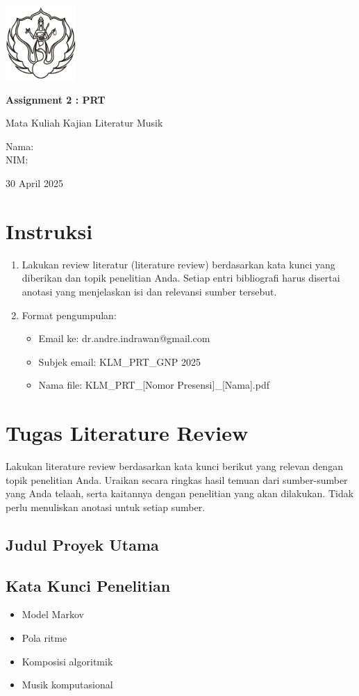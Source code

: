 \documentclass[a4paper,12pt]{article}
\newcommand{\AssignmentTitle}{Assignment 2 : PRT}
\renewcommand{\maketitle}{
  \begin{titlepage}
    \centering
    \includegraphics[width=0.2\textwidth]{../images/logo.png}\par\vspace{1cm}
    {\Huge\bfseries \AssignmentTitle}\par\vspace{0.5em}
    {\Large Mata Kuliah Kajian Literatur Musik}\par\vspace{2cm}
    {\large Nama: \AuthorName\\NIM: \AuthorNIM}\par\vspace{1cm}
    {\large 30 April 2025}\par
  \end{titlepage}
}
\begin{document}
\maketitle

\section*{Instruksi}
\begin{enumerate}
    \item Lakukan review literatur (literature review) berdasarkan kata kunci yang diberikan dan topik penelitian Anda. Setiap entri bibliografi harus disertai anotasi yang menjelaskan isi dan relevansi sumber tersebut.
    \item Format pengumpulan:
    \begin{itemize}
        \item Email ke: dr.andre.indrawan@gmail.com
        \item Subjek email: KLM\_PRT\_GNP 2025
        \item Nama file: KLM\_PRT\_[Nomor Presensi]\_[Nama].pdf
    \end{itemize}
\end{enumerate}

\section*{Tugas Literature Review}
Lakukan literature review berdasarkan kata kunci berikut yang relevan dengan topik penelitian Anda. Uraikan secara ringkas hasil temuan dari sumber-sumber yang Anda telaah, serta kaitannya dengan penelitian yang akan dilakukan. Tidak perlu menuliskan anotasi untuk setiap sumber.

\subsection*{Judul Proyek Utama}
\ThesisTitle

\subsection*{Kata Kunci Penelitian}
\begin{itemize}
    \item Model Markov
    \item Pola ritme
    \item Komposisi algoritmik
    \item Musik komputasional
\end{itemize}
\end{document}
